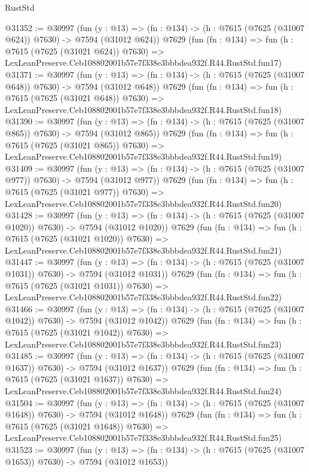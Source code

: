 \begin{lexlean}{RustStd}
\begin{coremodule}
@31352 := @30997
    (fun (y : @13) => (fn : @134) -> (h : @7615 (@7625 (@31007 @624)) @7630) -> @7594 (@31012 @624))
    @7629
    (fun (fn : @134) =>
    fun (h : @7615 (@7625 (@31021 @624)) @7630) =>
    LexLeanPreserve.Ceb108802001b57e7f338e3bbbdea932f.R44.RustStd.fun17)
@31371 := @30997
    (fun (y : @13) => (fn : @134) -> (h : @7615 (@7625 (@31007 @648)) @7630) -> @7594 (@31012 @648))
    @7629
    (fun (fn : @134) =>
    fun (h : @7615 (@7625 (@31021 @648)) @7630) =>
    LexLeanPreserve.Ceb108802001b57e7f338e3bbbdea932f.R44.RustStd.fun18)
@31390 := @30997
    (fun (y : @13) => (fn : @134) -> (h : @7615 (@7625 (@31007 @865)) @7630) -> @7594 (@31012 @865))
    @7629
    (fun (fn : @134) =>
    fun (h : @7615 (@7625 (@31021 @865)) @7630) =>
    LexLeanPreserve.Ceb108802001b57e7f338e3bbbdea932f.R44.RustStd.fun19)
@31409 := @30997
    (fun (y : @13) => (fn : @134) -> (h : @7615 (@7625 (@31007 @977)) @7630) -> @7594 (@31012 @977))
    @7629
    (fun (fn : @134) =>
    fun (h : @7615 (@7625 (@31021 @977)) @7630) =>
    LexLeanPreserve.Ceb108802001b57e7f338e3bbbdea932f.R44.RustStd.fun20)
@31428 := @30997
    (fun (y : @13) =>
    (fn : @134) -> (h : @7615 (@7625 (@31007 @1020)) @7630) -> @7594 (@31012 @1020))
    @7629
    (fun (fn : @134) =>
    fun (h : @7615 (@7625 (@31021 @1020)) @7630) =>
    LexLeanPreserve.Ceb108802001b57e7f338e3bbbdea932f.R44.RustStd.fun21)
@31447 := @30997
    (fun (y : @13) =>
    (fn : @134) -> (h : @7615 (@7625 (@31007 @1031)) @7630) -> @7594 (@31012 @1031))
    @7629
    (fun (fn : @134) =>
    fun (h : @7615 (@7625 (@31021 @1031)) @7630) =>
    LexLeanPreserve.Ceb108802001b57e7f338e3bbbdea932f.R44.RustStd.fun22)
@31466 := @30997
    (fun (y : @13) =>
    (fn : @134) -> (h : @7615 (@7625 (@31007 @1042)) @7630) -> @7594 (@31012 @1042))
    @7629
    (fun (fn : @134) =>
    fun (h : @7615 (@7625 (@31021 @1042)) @7630) =>
    LexLeanPreserve.Ceb108802001b57e7f338e3bbbdea932f.R44.RustStd.fun23)
@31485 := @30997
    (fun (y : @13) =>
    (fn : @134) -> (h : @7615 (@7625 (@31007 @1637)) @7630) -> @7594 (@31012 @1637))
    @7629
    (fun (fn : @134) =>
    fun (h : @7615 (@7625 (@31021 @1637)) @7630) =>
    LexLeanPreserve.Ceb108802001b57e7f338e3bbbdea932f.R44.RustStd.fun24)
@31504 := @30997
    (fun (y : @13) =>
    (fn : @134) -> (h : @7615 (@7625 (@31007 @1648)) @7630) -> @7594 (@31012 @1648))
    @7629
    (fun (fn : @134) =>
    fun (h : @7615 (@7625 (@31021 @1648)) @7630) =>
    LexLeanPreserve.Ceb108802001b57e7f338e3bbbdea932f.R44.RustStd.fun25)
@31523 := @30997
    (fun (y : @13) =>
    (fn : @134) -> (h : @7615 (@7625 (@31007 @1653)) @7630) -> @7594 (@31012 @1653))

\end{coremodule}
\end{lexlean}
